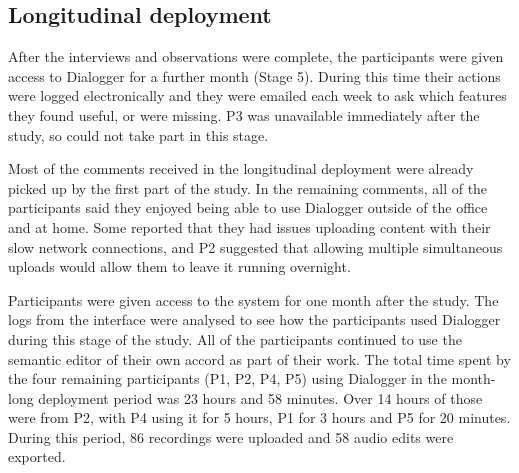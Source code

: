 \subsection{Longitudinal deployment}

After the interviews and observations were complete, the participants were given access to Dialogger for a further
month (Stage 5). During this time their actions were logged electronically and they were emailed each week to ask which
features they found useful, or were missing. P3 was unavailable immediately after the study, so could not take part in
this stage.

Most of the comments received in the longitudinal deployment were already picked up by the first part of the study. In
the remaining comments, all of the participants said they enjoyed being able to use Dialogger outside of the office and
at home. Some reported that they had issues uploading content with their slow network connections, and P2 suggested
that allowing multiple simultaneous uploads would allow them to leave it running overnight.

Participants were given access to the system for one month after the study.  The logs from the interface were analysed
to see how the participants used Dialogger during this stage of the study.
All of the participants continued to use the semantic editor of their own accord as part of their work. The total time
spent by the four remaining participants (P1, P2, P4, P5) using Dialogger in the month-long deployment period was 23
hours and 58 minutes.  Over 14 hours of those were from P2, with P4 using it for 5 hours, P1 for 3 hours and P5 for 20
minutes.  During this period, 86 recordings were uploaded and 58 audio edits were exported.


